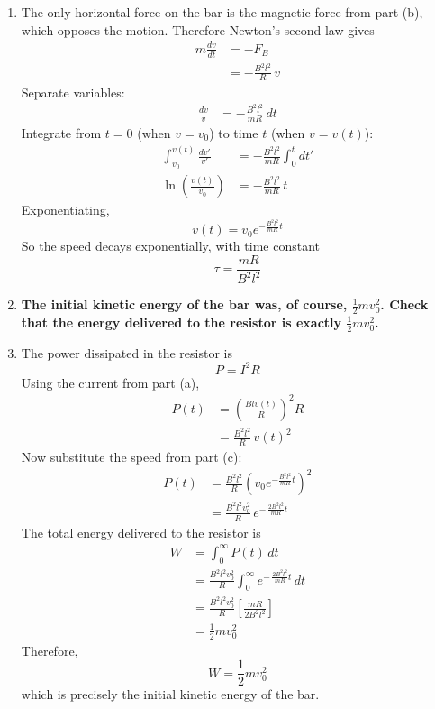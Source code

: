 \documentclass[12pt]{article}
\begin{document}
\begin{enumerate}
\item[Solution]
The only horizontal force on the bar is the magnetic force from part (b), which opposes the motion. Therefore Newton's second law gives
\[
\begin{aligned}
m\frac{dv}{dt}&=-F_B\\
&=-\frac{B^2l^2}{R}\,v
\end{aligned}
\]
Separate variables:
\[
\begin{aligned}
\frac{dv}{v}&=-\frac{B^2l^2}{mR}\,dt
\end{aligned}
\]
Integrate from $t=0$ (when $v=v_0$) to time $t$ (when $v=v(t)$):
\[
\begin{aligned}
\int_{v_0}^{v(t)}\frac{dv'}{v'}
&=-\frac{B^2l^2}{mR}\int_0^t dt'\\
\ln\!\left(\frac{v(t)}{v_0}\right)
&=-\frac{B^2l^2}{mR}\,t
\end{aligned}
\]
Exponentiating,
\[
v(t)=v_0 e^{-\frac{B^2l^2}{mR}t}
\]
So the speed decays exponentially, with time constant
\[
\boxed{\tau=\frac{mR}{B^2l^2}}
\]

\item[(d)] \textbf{The initial kinetic energy of the bar was, of course, $\tfrac12 mv_0^2$. Check that the energy delivered to the resistor is exactly $\tfrac12 mv_0^2$.}

\item[Solution]
The power dissipated in the resistor is
\[
P=I^2R
\]
Using the current from part (a),
\[
\begin{aligned}
P(t)
&=\left(\frac{Blv(t)}{R}\right)^2R\\
&=\frac{B^2l^2}{R}\,v(t)^2
\end{aligned}
\]
Now substitute the speed from part (c):
\[
\begin{aligned}
P(t)
&=\frac{B^2l^2}{R}\left(v_0 e^{-\frac{B^2l^2}{mR}t}\right)^2\\
&=\frac{B^2l^2v_0^2}{R}\,e^{-\,\frac{2B^2l^2}{mR}t}
\end{aligned}
\]
The total energy delivered to the resistor is
\[
\begin{aligned}
W
&=\int_0^\infty P(t)\,dt\\
&=\frac{B^2l^2v_0^2}{R}\int_0^\infty e^{-\,\frac{2B^2l^2}{mR}t}\,dt\\
&=\frac{B^2l^2v_0^2}{R}\left[\frac{mR}{2B^2l^2}\right]\\
&=\frac12 mv_0^2
\end{aligned}
\]
Therefore,
\[
W=\frac12 mv_0^2
\]
which is precisely the initial kinetic energy of the bar.
\end{enumerate}
\end{document}
